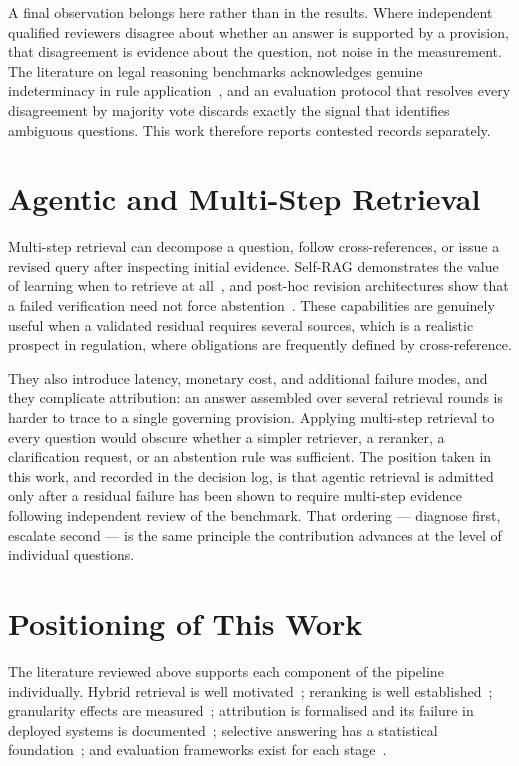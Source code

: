A final observation belongs here rather than in the results. Where independent qualified reviewers disagree about whether an answer is supported by a provision, that disagreement is evidence about the question, not noise in the measurement. The literature on legal reasoning benchmarks acknowledges genuine indeterminacy in rule application~\cite{guha2023legalbench,holzenberger2020sara}, and an evaluation protocol that resolves every disagreement by majority vote discards exactly the signal that identifies ambiguous questions. This work therefore reports contested records separately.

\section{Agentic and Multi-Step Retrieval}
\label{sec:sota-agentic}

Multi-step retrieval can decompose a question, follow cross-references, or issue a revised query after inspecting initial evidence. Self-RAG demonstrates the value of learning when to retrieve at all~\cite{asai2024selfrag}, and post-hoc revision architectures show that a failed verification need not force abstention~\cite{gao2023rarr}. These capabilities are genuinely useful when a validated residual requires several sources, which is a realistic prospect in regulation, where obligations are frequently defined by cross-reference.

They also introduce latency, monetary cost, and additional failure modes, and they complicate attribution: an answer assembled over several retrieval rounds is harder to trace to a single governing provision. Applying multi-step retrieval to every question would obscure whether a simpler retriever, a reranker, a clarification request, or an abstention rule was sufficient. The position taken in this work, and recorded in the decision log, is that agentic retrieval is admitted only after a residual failure has been shown to require multi-step evidence following independent review of the benchmark. That ordering --- diagnose first, escalate second --- is the same principle the contribution advances at the level of individual questions.

\section{Positioning of This Work}
\label{sec:sota-gap}

The literature reviewed above supports each component of the pipeline individually. Hybrid retrieval is well motivated~\cite{cormack2009rrf,bruch2024fusion,chen2024m3embedding}; reranking is well established~\cite{nogueira2019reranking,nogueira2020monot5}; granularity effects are measured~\cite{chen2024densex,liu2024lostmiddle}; attribution is formalised and its failure in deployed systems is documented~\cite{rashkin2023attribution,liu2023verifiability,magesh2025hallucination}; selective answering has a statistical foundation~\cite{geifman2017selective,kamath2020selective}; and evaluation frameworks exist for each stage~\cite{petroni2021kilt,es2024ragas,saadfalcon2024ares}.

